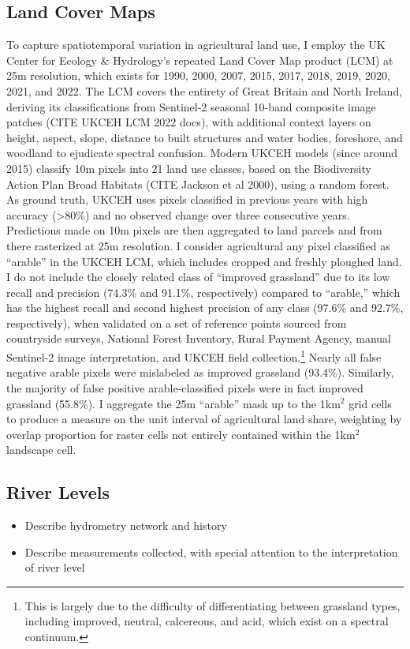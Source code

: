 \subsection{Land Cover Maps}
To capture spatiotemporal variation in agricultural land use, I employ the UK Center for Ecology \& Hydrology's repeated Land Cover Map product (LCM) at 25m resolution, which exists for 1990, 2000, 2007, 2015, 2017, 2018, 2019, 2020, 2021, and 2022. The LCM covers the entirety of Great Britain and North Ireland, deriving its classifications from Sentinel-2 seasonal 10-band composite image patches (CITE UKCEH LCM 2022 docs), with additional context layers on height, aspect, slope, distance to built structures and water bodies, foreshore, and woodland to ejudicate spectral confusion. Modern UKCEH models (since around 2015) classify 10m pixels into 21 land use classes, based on the Biodiversity Action Plan Broad Habitats (CITE Jackson et al 2000), using a random forest. As ground truth, UKCEH uses pixels classified in previous years with high accuracy (>80\%) and no observed change over three consecutive years. Predictions made on 10m pixels are then aggregated to land parcels and from there rasterized at 25m resolution. I consider agricultural any pixel classified as ``arable'' in the UKCEH LCM, which includes cropped and freshly ploughed land. I do not include the closely related class of ``improved grassland'' due to its low recall and precision (74.3\% and 91.1\%, respectively) compared to ``arable,'' which has the highest recall and second highest precision of any class (97.6\% and 92.7\%, respectively), when validated on a set of reference points sourced from countryside surveys, National Forest Inventory, Rural Payment Agency, manual Sentinel-2 image interpretation, and UKCEH field collection.\footnote{This is largely due to the difficulty of differentiating between grassland types, including improved, neutral, calcereous, and acid, which exist on a spectral continuum.} Nearly all false negative arable pixels were mislabeled as improved grassland (93.4\%). Similarly, the majority of false positive arable-classified pixels were in fact improved grassland (55.8\%). I aggregate the 25m ``arable'' mask up to the 1km$^2$ grid cells to produce a measure on the unit interval of agricultural land share, weighting by overlap proportion for raster cells not entirely contained within the 1km$^2$ landscape cell. 

\subsection{River Levels}
\begin{itemize}
    \item Describe hydrometry network and history
    \item Describe measurements collected, with special attention to the interpretation of river level
\end{itemize}

